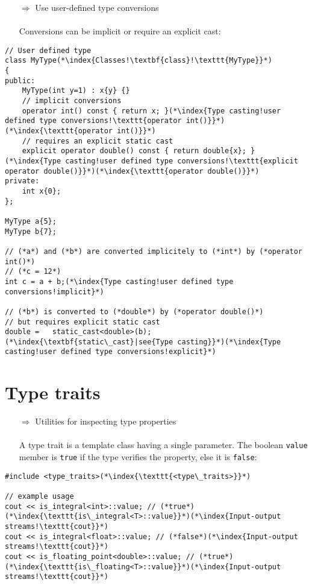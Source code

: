 \documentclass[10pt]{article}
\begin{document}
\begin{enumerate}
\item[$\Rightarrow$] Use user-defined type conversions\\ \\ Conversions can be implicit or require an explicit cast:
\end{enumerate}
\begin{lstlisting}
// User defined type
class MyType(*\index{Classes!\textbf{class}!\texttt{MyType}}*)
{
public:
    MyType(int y=1) : x{y} {}
    // implicit conversions
    operator int() const { return x; }(*\index{Type casting!user defined type conversions!\texttt{operator int()}}*)(*\index{\texttt{operator int()}}*)
    // requires an explicit static cast
    explicit operator double() const { return double{x}; }(*\index{Type casting!user defined type conversions!\texttt{explicit operator double()}}*)(*\index{\texttt{operator double()}}*)
private:
    int x{0};
};

MyType a{5};
MyType b{7};

// (*a*) and (*b*) are converted implicitely to (*int*) by (*operator int()*)
// (*c = 12*)
int c = a + b;(*\index{Type casting!user defined type conversions!implicit}*)

// (*b*) is converted to (*double*) by (*operator double()*)
// but requires explicit static cast
double =   static_cast<double>(b);(*\index{\textbf{static\_cast}|see{Type casting}}*)(*\index{Type casting!user defined type conversions!explicit}*)
\end{lstlisting}
%
%
\section{Type traits}
\small
\begin{enumerate}
\item[$\Rightarrow$] Utilities for inspecting type properties \\ \\A type trait is a template class having a single parameter. The boolean \texttt{value} member is \texttt{true} if the type verifies the property, else it is \texttt{false}:
\end{enumerate}
\begin{lstlisting}
#include <type_traits>(*\index{\texttt{<type\_traits>}}*)

// example usage
cout << is_integral<int>::value; // (*true*)(*\index{\texttt{is\_integral<T>::value}}*)(*\index{Input-output streams!\texttt{cout}}*)
cout << is_integral<float>::value; // (*false*)(*\index{Input-output streams!\texttt{cout}}*)
cout << is_floating_point<double>::value; // (*true*)(*\index{\texttt{is\_floating<T>::value}}*)(*\index{Input-output streams!\texttt{cout}}*)
\end{lstlisting}
%
%
\end{document}
